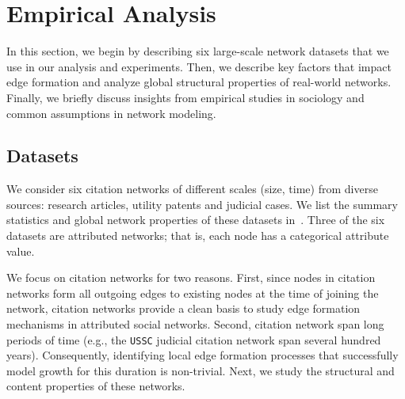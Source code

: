 
\section{Empirical Analysis}
\label{sec:Analysis}

In this section, we begin by describing six large-scale network datasets that we use in our
analysis and experiments. Then, we
describe key factors that impact edge formation and analyze global structural
properties of real-world networks. Finally, we briefly discuss insights from
empirical studies in sociology and common assumptions in network modeling.

\subsection{Datasets}
\label{sec:Datasets}

We consider six citation networks of different scales (size, time) from diverse
sources: research articles, utility patents and judicial cases. We list the
summary statistics and global network properties of these datasets in~.
Three of the six datasets are attributed networks; that is, each node has a categorical attribute value.

We focus on citation networks for two reasons. First, since nodes in citation networks form
all outgoing edges to existing nodes at the time of joining the network,
citation networks provide a clean basis to study edge formation mechanisms in
attributed social networks. Second, citation network span long periods of time (e.g.,
the \texttt{USSC} judicial citation network span several hundred years).
Consequently, identifying local edge formation processes that successfully model
growth for this duration is non-trivial.
Next, we study the structural and content properties of these networks.

